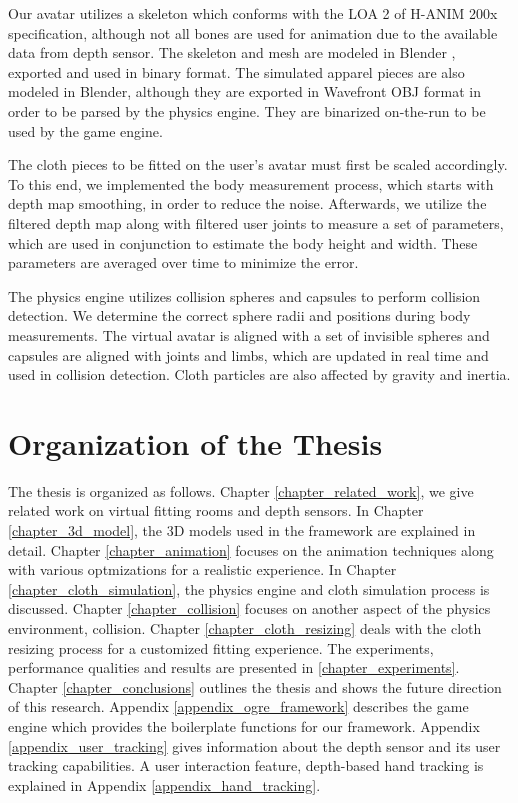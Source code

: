 Our avatar utilizes a skeleton which conforms with the LOA 2 of H-ANIM 200x specification\cite{HANIM}, although not all bones are used for 
animation due to the available data from depth sensor. The skeleton and mesh are modeled in Blender \cite{Blender}, exported and used in 
binary format. The simulated apparel pieces are also modeled in Blender, although they are exported in Wavefront OBJ format in order 
to be parsed by the physics engine. They are binarized on-the-run to be used by the game engine. 

The cloth pieces to be fitted on the user's avatar must first be scaled
accordingly. To this end, we implemented the body measurement process, 
which starts with depth map smoothing, in order to reduce the noise. 
Afterwards, we utilize the filtered depth map along with filtered
user joints to measure a set of parameters, which are used in conjunction
to estimate the body height and width. These parameters are averaged over 
time to minimize the error.

The physics engine utilizes collision spheres and capsules to perform
collision detection. We determine the correct sphere radii and positions 
during body measurements. The virtual avatar is aligned with a set of 
invisible spheres and capsules are aligned with joints and limbs, 
which are updated in real time and used in collision detection. 
Cloth particles are also affected by gravity and inertia.


\section{Organization of the Thesis}

The thesis is organized as follows. Chapter \ref{chapter_related_work}, we give related work on virtual fitting rooms and 
depth sensors. In Chapter \ref{chapter_3d_model}, the 3D models used in the framework are explained in detail. Chapter \ref{chapter_animation}
focuses on the animation techniques along with various optmizations for a realistic experience. In Chapter \ref{chapter_cloth_simulation}, the physics
engine and cloth simulation process is discussed. Chapter \ref{chapter_collision} focuses on another aspect of the physics environment, collision. 
Chapter \ref{chapter_cloth_resizing} deals with the cloth resizing process for a customized fitting experience. The experiments, performance qualities and 
results are presented in \ref{chapter_experiments}. Chapter \ref{chapter_conclusions} outlines the thesis and shows the future direction of this research.
Appendix \ref{appendix_ogre_framework} describes the game engine which provides the boilerplate functions for our framework. Appendix \ref{appendix_user_tracking}
gives information about the depth sensor and its user tracking capabilities. A user interaction feature, depth-based hand tracking is explained in Appendix \ref{appendix_hand_tracking}. 